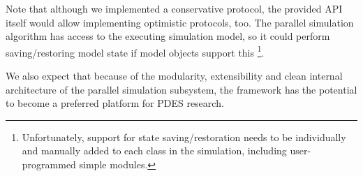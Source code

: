 Note that although we implemented a conservative protocol,
the provided API itself would allow implementing optimistic
protocols, too. The parallel simulation algorithm has
access to the executing simulation model, so it could perform
saving/restoring model state if model objects support this%
\footnote{Unfortunately, support for state saving/restoration
needs to be individually and manually added to each class
in the simulation, including user-programmed simple modules.}.

We also expect that because of the modularity, extensibility and
clean internal architecture of the parallel simulation subsystem,
the {\opp} framework has the potential to become a preferred platform
for PDES research.



